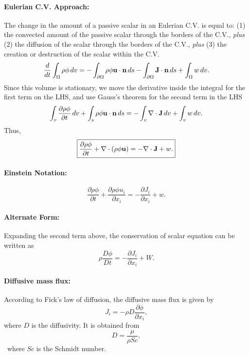 \documentclass[oneside,a4paper,11pt]{report}
\begin{document}
\paragraph{Eulerian C.V. Approach:}
The change in the amount of a passive scalar in an Eulerian C.V. is equal to: (1) the convected amount of the passive scalar through the borders of the C.V., \textit{plus} (2) the diffusion of the scalar through the borders of the C.V., \textit{plus} (3) the creation or destruction of the scalar within the C.V. 
\begin{equation}
\frac{d}{dt}\int_\Omega \rho \phi \,dv = -\int_{\partial \Omega} \rho \phi \mathbf{u} \cdot \mathbf{n} \,ds - \int_{\partial \Omega} \mathbf{J} \cdot \mathbf{n} \, ds + \int_{\Omega} w \, dv.
\end{equation}
Since this volume is stationary, we move the derivative inside the integral for the first term on the LHS, and use Gauss's theorem for the second term in the LHS
\begin{equation}
\int_v \frac{\partial \rho \phi}{\partial t}\,dv+\int_s \rho \phi \mathbf{u} \cdot \mathbf{n} \,ds = -\int_v \nabla \cdot \mathbf{J} \, dv  + \int_v w \, dv.
\end{equation}
Thus,
\begin{equation}
\label{eq:scalar_conservation_vector}
\boxed{\frac{\partial \rho \phi}{\partial t} + \nabla \cdot (\rho \phi \mathbf{u}) = -\nabla \cdot \mathbf{J} + w .}
\end{equation}

\paragraph{Einstein Notation:}
\begin{equation}
\label{eq:scalar_conservation_tensor}
\boxed{\frac{\partial\rho \phi}{\partial t}+\frac{\partial \rho \phi u_i}{\partial x_i} = -\frac{\partial J_i}{\partial x_i} + w .}
\end{equation}

\paragraph{Alternate Form:}
Expanding the second term above, the conservation of scalar equation can be written as
\begin{equation}
\label{eq:scalar_conservation_noncons}
\rho \frac{D\phi}{Dt} =  -\frac{\partial J_i}{\partial x_i} + W.
\end{equation}

\paragraph{Diffusive mass flux:}
According to Fick's law of diffusion, the diffusive mass flux is given by
\begin{equation}
J_i = -\rho D \frac{\partial \phi}{\partial x_i},
\end{equation}
where $D$ is the diffusivity. It is obtained from
\begin{equation}
D = \frac{\mu}{\rho Sc},
\end{equation}\
where $Sc$ is the Schmidt number.
\end{document}
